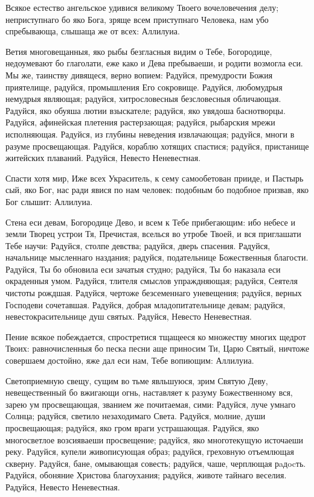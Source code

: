 \begin{mymulticols}

Всякое естество ангельское удивися великому Твоего вочеловечения делу; неприступнаго бо яко Бога, зряще всем приступнаго Человека, нам убо спребывающа, слышаща же от всех: Аллилуиа.


Ветия многовещанныя, яко рыбы безгласныя видим о Тебе, Богородице, недоумевают бо глаголати, еже како и Дева пребываеши, и родити возмогла еси. Мы же, таинству дивящеся, верно вопием: Радуйся, премудрости Божия приятелище, радуйся, промышления Его сокровище. Радуйся, любомудрыя немудрыя являющая; радуйся, хитрословесныя безсловесныя обличающая. Радуйся, яко обуяша лютии взыскателе; радуйся, яко увядоша баснотворцы. Радуйся, афинейская плетения растерзающая; радуйся, рыбарския мрежи исполняющая. Радуйся, из глубины неведения извлачающая; радуйся, многи в разуме просвещающая. Радуйся, кораблю хотящих спастися; радуйся, пристанище житейских плаваний. Радуйся, Невесто Неневестная.


Спасти хотя мир, Иже всех Украситель, к сему самообетован прииде, и Пастырь сый, яко Бог, нас ради явися по нам человек: подобным бо подобное призвав, яко Бог слышит: Аллилуиа.


Стена еси девам, Богородице Дево, и всем к Тебе прибегающим: ибо небесе и земли Творец устрои Тя, Пречистая, вселься во утробе Твоей, и вся приглашати Тебе научи: Радуйся, столпе девства; радуйся, дверь спасения. Радуйся, начальнице мысленнаго наздания; радуйся, подательнице Божественныя благости. Радуйся, Ты бо обновила еси зачатыя студно; радуйся, Ты бо наказала еси окраденныя умом. Радуйся, тлителя смыслов упраждняющая; радуйся, Сеятеля чистоты рождшая. Радуйся, чертоже безсеменнаго уневещения; радуйся, верных Господеви сочетавшая. Радуйся, добрая младопитательнице девам; радуйся, невестокрасительнице душ святых. Радуйся, Невесто Неневестная.


Пение всякое побеждается, спростретися тщащееся ко множеству многих щедрот Твоих: равночисленныя бо песка песни аще приносим Ти, Царю Святый, ничтоже совершаем достойно, яже дал еси нам, Тебе вопиющим: Аллилуиа.


Светоприемную свещу, сущим во тьме явльшуюся, зрим Святую Деву, невещественный бо вжигающи огнь, наставляет к разуму Божественному вся, зарею ум просвещающая, званием же почитаемая, сими: Радуйся, луче умнаго Солнца; радуйся, светило незаходимаго Света. Радуйся, молние, души просвещающая; радуйся, яко гром враги устрашающая. Радуйся, яко многосветлое возсияваеши просвещение; радуйся, яко многотекущую источаеши реку. Радуйся, купели живописующая образ; радуйся, греховную отъемлющая скверну. Радуйся, бане, омывающая совесть; радуйся, чаше, черплющая рaдocть. Радуйся, обоняние Христова благоухания; радуйся, животе тайнаго веселия. Радуйся, Невесто Неневестная.


\end{mymulticols}
